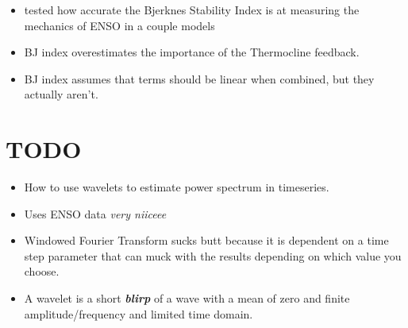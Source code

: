 \documentclass[11pt]{article}
\begin{document}
\begin{itemize}
\item tested how accurate the Bjerknes Stability Index is at measuring the mechanics of ENSO in a couple models
\item BJ index overestimates the importance of the Thermocline feedback.
\item BJ index assumes that terms should be linear when combined, but they actually aren't.
\end{itemize}

\section{{\bfseries\sffamily TODO} \cite{torrence1998practical}}
\label{sec:org96cb080}

\begin{itemize}
\item How to use wavelets to estimate power spectrum in timeseries.
\item Uses ENSO data \emph{very niiceee}
\item Windowed Fourier Transform sucks butt because it is dependent on a time step parameter that can muck with the results depending on which value you choose.
\item A wavelet is a short \textbf{\emph{blirp}} of a wave with a mean of zero and finite amplitude/frequency and limited time domain.
\end{itemize}





\end{document}
